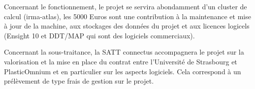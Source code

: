\documentclass[12pt]{article}
\begin{document}
Concernant le fonctionnement, le projet se servira abondamment d'un cluster de
calcul (irma-atlas), les 5000 Euros sont une contribution à la maintenance et
mise à jour de la machine, aux stockages des données du projet et aux licences
logicels (Ensight 10 et DDT/MAP qui sont des logiciels commerciaux).

Concernant la sous-traitance, la SATT connectus accompagnera le projet sur la
valorisation et la mise en place du contrat entre l'Université de Strasbourg et
PlasticOmnium et en particulier sur les aspects logiciels. Cela correspond à un
prélèvement de type frais de gestion sur le projet.




\end{document}
